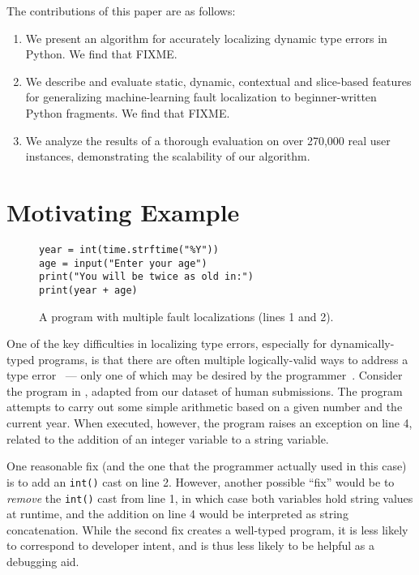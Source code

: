 \documentclass[conference]{IEEEtran}
\newcommand\lt[1]{{\lstinline|#1|}}
\begin{document}
The contributions of this paper are as follows:
\begin{enumerate}

\item We present an algorithm for accurately localizing dynamic type errors
in Python. We find that FIXME.

\item We describe and evaluate static, dynamic, contextual and slice-based
features for generalizing machine-learning fault localization to
beginner-written Python fragments. We find that FIXME.

\item We analyze the results of a thorough evaluation on over 270,000 real
user instances, demonstrating the scalability of our algorithm.

\end{enumerate}

\section{Motivating Example}
\label{sec-motex}

\begin{figure}
\begin{lstlisting}
year = int(time.strftime("%Y"))
age = input("Enter your age")
print("You will be twice as old in:")
print(year + age)
\end{lstlisting}
\caption{
\label{fig-motex}
A program with multiple fault localizations (lines 1 and 2).}
\end{figure}

One of the key difficulties in localizing type errors, especially for
dynamically-typed programs, is that there are often multiple
logically-valid ways to address a type error~\cite{FIXME} --- only one of
which may be desired by the programmer~\cite{FIXME}.  Consider the program
in , adapted from our dataset of human submissions. The
program attempts to carry out some simple arithmetic based on a given
number and the current year. When executed, however, the program raises an
exception on line 4, related to the addition of an integer variable to a
string variable.

One reasonable fix (and the one that the programmer actually used in this
case) is to add an \lt{int()} cast on line 2. However, another possible
``fix'' would be to \textit{remove} the \lt{int()} cast from line 1, in
which case both variables hold string values at runtime, and the addition
on line 4 would be interpreted as string concatenation. While the second
fix creates a well-typed program, it is less likely to correspond to
developer intent, and is thus less likely to be helpful as a debugging aid.
\end{document}

